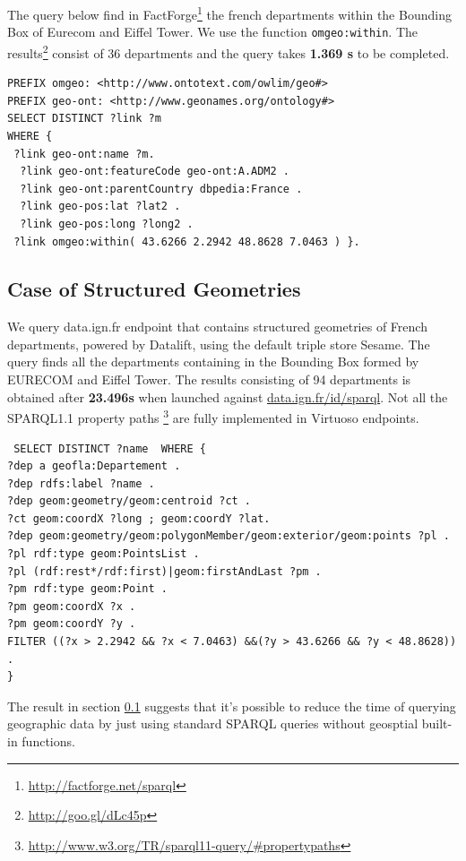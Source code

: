The query below find in FactForge\footnote{\url{http://factforge.net/sparql}} the french departments within the Bounding Box of Eurecom and Eiffel Tower. We use the function \texttt{omgeo:within}. The results\footnote{\url{http://goo.gl/dLc45p}} consist of 36 departments and the query takes \textbf{1.369 s} to be completed.
\begin{verbatim}
PREFIX omgeo: <http://www.ontotext.com/owlim/geo#>
PREFIX geo-ont: <http://www.geonames.org/ontology#>
SELECT DISTINCT ?link ?m
WHERE {
 ?link geo-ont:name ?m.
  ?link geo-ont:featureCode geo-ont:A.ADM2 .
  ?link geo-ont:parentCountry dbpedia:France .
  ?link geo-pos:lat ?lat2 .
  ?link geo-pos:long ?long2 .
 ?link omgeo:within( 43.6266 2.2942 48.8628 7.0463 ) }.

\end{verbatim}


\subsection{Case of Structured Geometries}
\label{sec:ignsparql}
 We query data.ign.fr endpoint that contains structured geometries of French departments, powered by Datalift, using the default triple store Sesame. The query finds all the departments containing in the Bounding Box formed by EURECOM and Eiffel Tower. The results consisting of 94 departments is obtained after \textbf{23.496s} when launched against \url{data.ign.fr/id/sparql}. Not all the SPARQL1.1 property paths \footnote{\url{http://www.w3.org/TR/sparql11-query/\#propertypaths}} are fully implemented in Virtuoso endpoints.


 \begin{verbatim}
 SELECT DISTINCT ?name  WHERE {
?dep a geofla:Departement .
?dep rdfs:label ?name .
?dep geom:geometry/geom:centroid ?ct .
?ct geom:coordX ?long ; geom:coordY ?lat.
?dep geom:geometry/geom:polygonMember/geom:exterior/geom:points ?pl .
?pl rdf:type geom:PointsList .
?pl (rdf:rest*/rdf:first)|geom:firstAndLast ?pm .
?pm rdf:type geom:Point .
?pm geom:coordX ?x .
?pm geom:coordY ?y .
FILTER ((?x > 2.2942 && ?x < 7.0463) &&(?y > 43.6266 && ?y < 48.8628)) .
}
 \end{verbatim}


The result in section \ref{sec:ignsparql} suggests that it's possible to reduce the time of querying geographic data by just using standard SPARQL queries without geosptial built-in functions.

